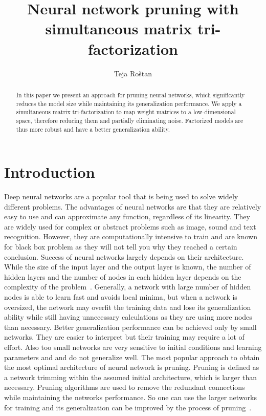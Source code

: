 \documentclass{article} %
\title{Neural network pruning with simultaneous matrix tri-factorization}
\author{Teja Ro\v{s}tan}
\begin{document}
\maketitle

\begin{abstract}

In this paper we present an approach for pruning neural networks, which
significantly reduces the model size while maintaining its generalization
performance. We apply a simultaneous matrix tri-factorization to map weight
matrices to a low-dimensional space, therefore reducing them and partially
eliminating noise. Factorized models are thus more robust and have a better
generalization ability.

\end{abstract}

\section{Introduction}

Deep neural networks are a popular tool that is being used to solve widely
different problems. The advantages of neural networks are that they are
relatively easy to use and can approximate any function, regardless of its
linearity. They are widely used for complex or abstract problems such as image,
sound and text recognition. However, they are computationally intensive to
train and are known for black box problem as they will not tell you why they
reached a certain conclusion. Success of neural networks largely depends on
their architecture. While the size of the input layer and the output layer is
known, the number of hidden layers and the number of nodes in each hidden layer
depends on the complexity of the problem~\cite{augasta2013pruning}. Generally,
a network with large number of hidden nodes is able to learn fast and avoids
local minima, but when a network is oversized, the network may overfit the
training data and lose its generalization ability while still having
unnecessary calculations as they are using more nodes than necessary. Better
generalization performance can be achieved only by small networks. They are
easier to interpret but their training may require a lot of effort. Also too
small networks are very sensitive to initial conditions and learning parameters
and and do not generalize well. The most popular approach to
obtain the most optimal architecture of neural network is pruning. Pruning is
defined as a network trimming within the assumed initial architecture, which is
larger than necessary. Pruning algorithms are used to remove the redundant
connections while maintaining the networks performance. So one can use the
larger networks for training and its generalization can be improved by the
process of pruning~\cite{augasta2013pruning}.
\end{document}

